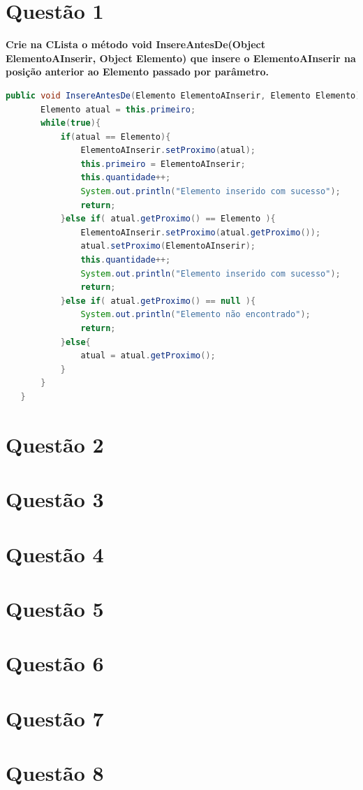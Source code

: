 \documentclass[
	12pt,				%
	openright,			%
	twoside,			%
	a4paper,			%
	english,			%
	french,				%
	spanish,			%
	brazil				%
	]{abntex2}
\begin{document}
\tableofcontents

\section{Questão 1}
\textbf{Crie na CLista o método void InsereAntesDe(Object ElementoAInserir, Object Elemento) que insere o ElementoAInserir na posição anterior ao Elemento passado por parâmetro.}
\begin{lstlisting}[language=Java, style=chstyle] 
    public void InsereAntesDe(Elemento ElementoAInserir, Elemento Elemento){
       Elemento atual = this.primeiro;
       while(true){
           if(atual == Elemento){
               ElementoAInserir.setProximo(atual);
               this.primeiro = ElementoAInserir;
               this.quantidade++;
               System.out.println("Elemento inserido com sucesso");
               return;
           }else if( atual.getProximo() == Elemento ){
               ElementoAInserir.setProximo(atual.getProximo());
               atual.setProximo(ElementoAInserir);
               this.quantidade++;
               System.out.println("Elemento inserido com sucesso");
               return;
           }else if( atual.getProximo() == null ){
               System.out.println("Elemento não encontrado");
               return;
           }else{
               atual = atual.getProximo();
           }
       }
   }
\end{lstlisting}

\section{Questão 2}
\section{Questão 3}
\section{Questão 4}
\section{Questão 5}
\section{Questão 6}
\section{Questão 7}
\section{Questão 8}
\end{document}
